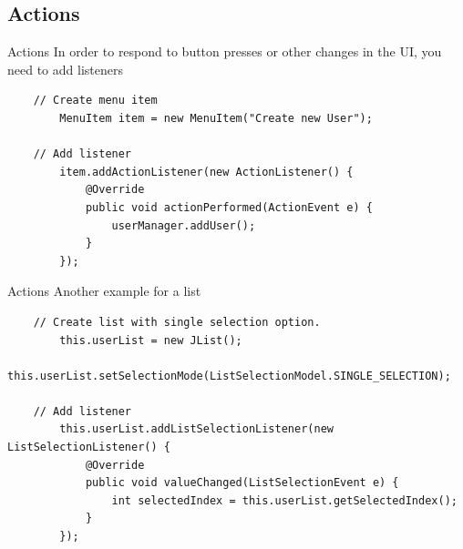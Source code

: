 \subsection{Actions}
\begin{frame}[fragile]{Actions}
  In order to respond to button presses or other changes in the UI, you need to add listeners
	\begin{lstlisting}
    // Create menu item
		MenuItem item = new MenuItem("Create new User");
  
    // Add listener
		item.addActionListener(new ActionListener() {
			@Override
			public void actionPerformed(ActionEvent e) {
				userManager.addUser();
			}
		});
  \end{lstlisting}
\end{frame}
    
\begin{frame}[fragile]{Actions}
  Another example for a list
	\begin{lstlisting}
    // Create list with single selection option.
		this.userList = new JList();
		this.userList.setSelectionMode(ListSelectionModel.SINGLE_SELECTION);
      
    // Add listener
		this.userList.addListSelectionListener(new ListSelectionListener() {
			@Override
			public void valueChanged(ListSelectionEvent e) {
				int selectedIndex = this.userList.getSelectedIndex();
			}
		});
    \end{lstlisting}
\end{frame}
